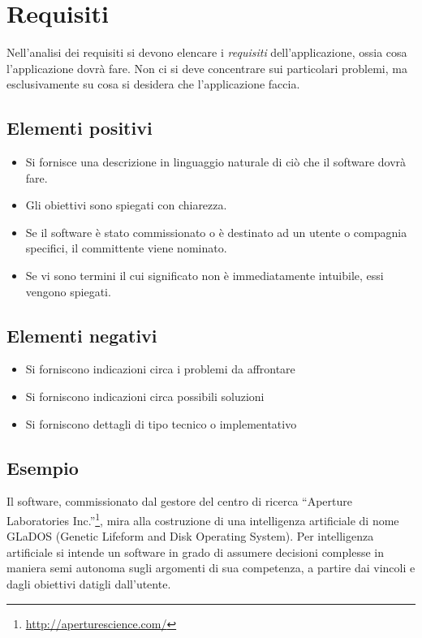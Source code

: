 \documentclass[a4paper,12pt]{report}
\begin{document}
\section{Requisiti}

Nell'analisi dei requisiti si devono elencare i \emph{requisiti} dell'applicazione, ossia cosa l'applicazione dovrà fare.
%
Non ci si deve concentrare sui particolari problemi, ma esclusivamente su cosa si desidera che l'applicazione faccia.

\subsection*{Elementi positivi}
\begin{itemize}
	\item Si fornisce una descrizione in linguaggio naturale di ciò che il software dovrà fare.
	\item Gli obiettivi sono spiegati con chiarezza.
	\item Se il software è stato commissionato o è destinato ad un utente o compagnia specifici, il committente viene nominato.
	\item Se vi sono termini il cui significato non è immediatamente intuibile, essi vengono spiegati.
\end{itemize}

\subsection*{Elementi negativi}
\begin{itemize}
	\item Si forniscono indicazioni circa i problemi da affrontare
	\item Si forniscono indicazioni circa possibili soluzioni
	\item Si forniscono dettagli di tipo tecnico o implementativo
\end{itemize}

\subsection*{Esempio}
Il software, commissionato dal gestore del centro di ricerca ``Aperture Laboratories Inc.''\footnote{\url{http://aperturescience.com/}}, mira alla costruzione di una intelligenza artificiale di nome GLaDOS (Genetic Lifeform and Disk Operating System).
%
Per intelligenza artificiale si intende un software in grado di assumere decisioni complesse in maniera semi autonoma sugli argomenti di sua competenza, a partire dai vincoli e dagli obiettivi datigli dall'utente.
\end{document}
